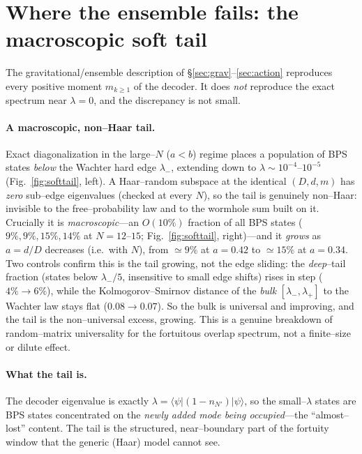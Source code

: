 \documentclass[11pt]{article}
\newcommand{\ket}[1]{\lvert #1\rangle}
\newcommand{\bra}[1]{\langle #1\rvert}
\begin{document}
\section{Where the ensemble fails: the macroscopic soft tail}
\label{sec:softtail}

The gravitational/ensemble description of \S\ref{sec:grav}--\ref{sec:action} reproduces every
positive moment $m_{k\ge1}$ of the decoder. It does \emph{not} reproduce the exact spectrum near
$\lambda=0$, and the discrepancy is not small.

\paragraph{A macroscopic, non--Haar tail.}
Exact diagonalization in the large--$N$ ($a<b$) regime places a population of BPS states \emph{below}
the Wachter hard edge $\lambda_-$, extending down to $\lambda\sim10^{-4}$--$10^{-5}$
(Fig.~\ref{fig:softtail}, left). A Haar--random subspace at the identical $(D,d,m)$ has \emph{zero}
sub--edge eigenvalues (checked at every $N$), so the tail is genuinely non--Haar: invisible to the
free--probability law and to the wormhole sum built on it. Crucially it is \emph{macroscopic}---an
$O(10\%)$ fraction of all BPS states ($9\%,9\%,15\%,14\%$ at $N=12$--$15$; Fig.~\ref{fig:softtail},
right)---and it \emph{grows} as $a=d/D$ decreases (i.e.\ with $N$), from $\simeq9\%$ at $a=0.42$ to
$\simeq15\%$ at $a=0.34$. Two controls confirm this is the tail growing, not the edge sliding: the
\emph{deep}--tail fraction (states below $\lambda_-/5$, insensitive to small edge shifts) rises in
step ($4\%\to6\%$), while the Kolmogorov--Smirnov distance of the \emph{bulk} $[\lambda_-,\lambda_+]$
to the Wachter law stays flat ($0.08\to0.07$). So the bulk is universal and improving, and the tail
is the non--universal excess, growing. This is a genuine breakdown of random--matrix universality for
the fortuitous overlap spectrum, not a finite--size or dilute effect.

\paragraph{What the tail is.}
The decoder eigenvalue is exactly $\lambda=\bra{\psi}(1-n_{N'})\ket{\psi}$, so the small--$\lambda$
states are BPS states concentrated on the \emph{newly added mode being occupied}---the
``almost--lost'' content. The tail is the structured, near--boundary part of the fortuity window that
the generic (Haar) model cannot see.
\end{document}
